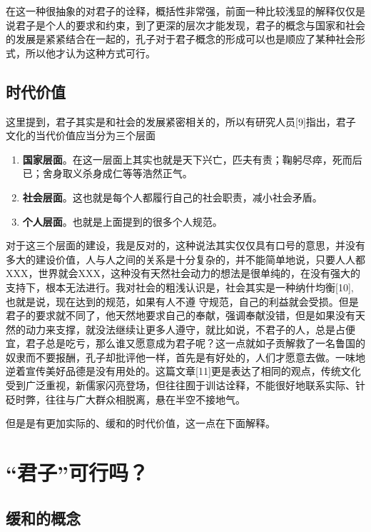 \documentclass[]{article}
\begin{document}
在这一种很抽象的对君子的诠释，概括性非常强，前面一种比较浅显的解释仅仅是说君子是个人的要求和约束，到了更深的层次才能发现，君子的概念与国家和社会的发展是紧紧结合在一起的，孔子对于君子概念的形成可以也是顺应了某种社会形式，所以他才认为这种方式可行。

\hypertarget{header-n78}{%
\subsection{时代价值}\label{header-n78}}

这里提到，君子其实是和社会的发展紧密相关的，所以有研究人员{[}9{]}指出，君子文化的当代价值应当分为三个层面

\begin{enumerate}
\def\labelenumi{\arabic{enumi}.}
\item
  \textbf{国家层面}。在这一层面上其实也就是天下兴亡，匹夫有责；鞠躬尽瘁，死而后已；舍身取义杀身成仁等等浩然正气。
\item
  \textbf{社会层面}。这也就是每个人都履行自己的社会职责，减小社会矛盾。
\item
  \textbf{个人层面}。也就是上面提到的很多个人规范。
\end{enumerate}

对于这三个层面的建设，我是反对的，这种说法其实仅仅具有口号的意思，并没有多大的建设价值，人与人之间的关系是十分复杂的，并不能简单地说，只要人人都XXX，世界就会XXX，这种没有天然社会动力的想法是很单纯的，在没有强大的支持下，根本无法进行。我对社会的粗浅认识是，社会其实是一种纳什均衡{[}10{]},
也就是说，现在达到的规范，如果有人不遵
守规范，自己的利益就会受损。但是君子的要求就不同了，他天然地要求自己的奉献，强调奉献没错，但是如果没有天然的动力来支撑，就没法继续让更多人遵守，就比如说，不君子的人，总是占便宜，君子总是吃亏，那么谁又愿意成为君子呢？这一点就如子贡解救了一名鲁国的奴隶而不要报酬，孔子却批评他一样，首先是有好处的，人们才愿意去做。一味地逆着宣传美好品德是没有用处的。这篇文章{[}11{]}更是表达了相同的观点，传统文化受到广泛重视，新儒家闪亮登场，但往往囿于训诂诠释，不能很好地联系实际、针砭时弊，往往与广大群众相脱离，悬在半空不接地气。

但是是有更加实际的、缓和的时代价值，这一点在下面解释。

\hypertarget{header-n95}{%
\section{``君子''可行吗？}\label{header-n95}}

\hypertarget{header-n96}{%
\subsection{缓和的概念}\label{header-n96}}
\end{document}
